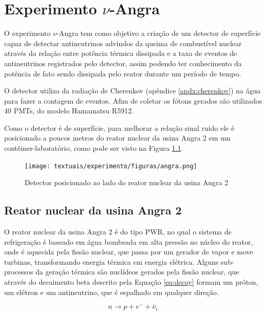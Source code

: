 \chapter{Experimento $\nu$-Angra}\label{cap:experimento}
\vspace{-2cm}

O experimento $\nu$-Angra tem como objetivo a criação de um detector de superfície capaz de detectar antineutrinos advindos da queima de combustível nuclear através da relação entre potência térmica dissipada e a taxa de eventos de antineutrinos registrados pelo detector, assim podendo ter conhecimento da potência de fato sendo dissipada pelo reator durante um período de tempo.

O detector utiliza da radiação de Cherenkov (apêndice \ref{apdx:cherenkov}) na água para fazer a contagem de eventos. Afim de coletar os fótons gerados são utilizados 40 PMTs, do modelo Hamamatsu R5912. \cite{hamamatsu1998photomultiplier}

Como o detector é de superfície, para melhorar a relação sinal ruído ele é posicionado a poucos metros do reator nuclear da usina Angra 2 em um contêiner-laboratório, como pode ser visto na Figura \ref{fig:angra}.

\begin{figure}[H]
	\centering
	\texttt{[image: textuais/experimento/figuras/angra.png]}
	\caption{Detector posicionado ao lado do reator nuclear da usina Angra 2}
	\label{fig:angra}
\end{figure}

\section{Reator nuclear da usina Angra 2}

O reator nuclear da usina Angra 2 é do tipo \ac{PWR}, no qual o sistema de refrigeração é baseado em água bombeada em alta pressão no núcleo do reator, onde é aquecida pela fissão nuclear, que passa por um gerador de vapor e move turbinas, transformando energia térmica em energia elétrica. Alguns sub-processos da geração térmica são nuclídeos gerados pela fissão nuclear, que através do decaimento beta descrito pela Equação \ref{eq:decay} formam um próton, um elétron e um antineutrino, que é espalhado em qualquer direção.

\begin{equation}
n \rightarrow p + e^- + \bar{\nu}_e 
\label{eq:decay}
\end{equation}


